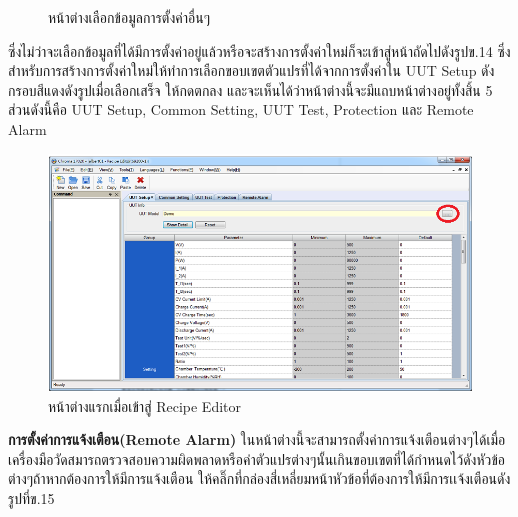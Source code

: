 \begin{center}
\begin{figure}[H]
		\centering
		\captionsetup{justification=centering,margin=2cm}
		\caption{หน้าต่างเลือกข้อมูลการตั้งค่าอื่นๆ}
	\end{figure}
\end{center}
ซึ่งไม่ว่าจะเลือกข้อมูลที่ได้มีการตั้งค่าอยู่แล้วหรือจะสร้างการตั้งค่าใหม่ก็จะเข้าสู่หน้าถัดไปดังรูปข.14 ซึ่งสำหรับการสร้างการตั้งค่าใหม่ให้ทำการเลือกขอบเขตตัวแปรที่ได้จากการตั้งค่าใน UUT Setup ดังกรอบสีแดงดังรูปเมื่อเลือกเสร็จ
ให้กดตกลง และจะเห็นได้ว่าหน้าต่างนี้จะมีแถบหน้าต่างอยู่ทั้งสิ้น 5 ส่วนดังนี้คือ UUT Setup, Common Setting, UUT Test, Protection และ Remote Alarm
\begin{center}
	\begin{figure}[H]
		\includegraphics[width=1\linewidth]{Chapters/img/17020_Program/Recipe_Editor/Setting_param_UUT_recipe_editor.png}
		\centering
		\captionsetup{justification=centering,margin=2cm}
		\caption{หน้าต่างแรกเมื่อเข้าสู่ Recipe Editor}
	\end{figure}
\end{center}
\textbf{การตั้งค่าการแจ้งเตือน(Remote Alarm)}
\newline \hspace*{2cm}
ในหน้าต่างนี้จะสามารถตั้งค่าการแจ้งเตือนต่างๆได้เมื่อเครื่องมือวัดสมารถตรวจสอบความผิดพลาดหรือค่าตัวแปรต่างๆนั้นเกินขอบเขตที่ได้กำหนดไว้ดังหัวข้อต่างๆถ้าหากต้องการให้มีการแจ้งเตือน
ให้คลิ๊กที่กล่องสี่เหลี่ยมหน้าหัวข้อที่ต้องการให้มีการเเจ้งเตือนดังรูปที่ข.15
